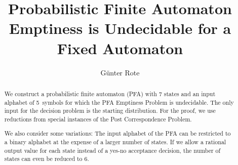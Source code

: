 \documentclass[a4paper,cleveref, autoref, thm-restate]{lipics-v2021}
\title{Probabilistic Finite Automaton Emptiness is
          Undecidable
          for a Fixed Automaton}
\author{G\"unter Rote}{Freie Universit\"at Berlin, Institut für
  Informatik,
Takustr.~%
 9, 14195 Berlin, Germany
}{rote@inf.fu-berlin.de}{https://orcid.org/0000-0002-0351-5945}{}
\begin{document}

  \def\sectionautorefname{Section} %
  \def\subsectionautorefname{Section} %

\maketitle

\let\paragraph=\subparagraph

\begin{abstract}
  We construct a 
  probabilistic finite automaton (PFA) with 7 states
  and an input alphabet of 5~symbols
for which the PFA Emptiness Problem is undecidable.
The only %
input for the decision problem is the starting distribution.
For the proof, we use reductions from special instances of the Post
Correspondence Problem.

We also consider some variations:
The input alphabet of the PFA can be restricted to a binary alphabet
at the expense of a larger
number of states.  If we allow a rational output value %
for each state %
instead of a yes-no acceptance decision,
the number
of states can even be reduced to 6. %

\end{abstract}

\end{document}
